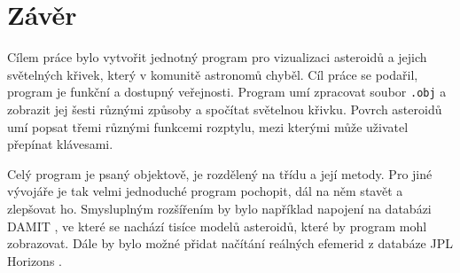 \documentclass[11pt]{article}
\begin{document}

\clearpage
\section*{Závěr}

Cílem práce bylo vytvořit jednotný program pro vizualizaci asteroidů a jejich světelných křivek, který v komunitě astronomů chyběl. Cíl práce se podařil, program je funkční a dostupný veřejnosti. Program umí zpracovat soubor \verb|.obj| a zobrazit jej šesti různými způsoby a spočítat světelnou křivku. Povrch asteroidů umí popsat třemi různými funkcemi rozptylu, mezi kterými může uživatel přepínat klávesami. 

Celý program je psaný objektově, je rozdělený na třídu a její metody. Pro jiné vývojáře je tak velmi jednoduché program pochopit, dál na něm stavět a zlepšovat ho. Smysluplným rozšířením by bylo například napojení na databázi DAMIT \citep{Durech_2023A&A...675A..24D}, ve které se nachází tisíce modelů asteroidů, které by program mohl zobrazovat. Dále by bylo možné přidat načítání reálných efemerid z databáze JPL Horizons \citep{jpl_horizons}. 


\newpage
{}


\end{document}
